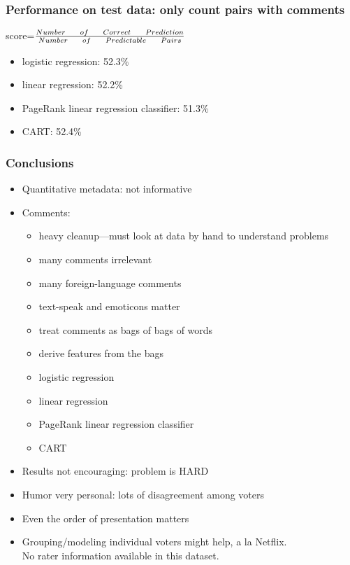 \documentclass[fleqn]{beamer}
\begin{document}
\begin{frame}
\frametitle{Performance on test data: only count pairs with comments}
\begin{beamerboxesrounded}{}
	\begin{center}
	 score=$\frac{Number \indent of \indent Correct \indent Prediction}{Number \indent of \indent Predictable \indent Pairs}$
         \end{center}
	\end{beamerboxesrounded}
      \begin{itemize}
        \item logistic regression: 52.3\%
        \item linear regression: 52.2\%
        \item PageRank linear regression classifier: 51.3\%
        \item CART: 52.4\% 
    \end{itemize}

\end{frame}

\begin{frame}
\frametitle{Conclusions}
    \begin{itemize}
        \item Quantitative metadata: not informative
        \item Comments: 
        	\begin{itemize}
	   \item heavy cleanup---must look at data by hand to understand problems
	   \item many comments irrelevant
	   \item many foreign-language comments
	   \item text-speak and emoticons matter
	   \item treat comments as bags of bags of words
	   \item derive features from the bags
	   \item logistic regression
	   \item linear regression
	   \item PageRank linear regression classifier
	   \item CART
	\end{itemize}
       \item Results not encouraging: problem is HARD
       \item Humor very personal: lots of disagreement among voters
       \item Even the order of presentation matters
       \item Grouping/modeling individual voters might help, a la Netflix. \\
                No rater information available in this dataset.
    \end{itemize}

\end{frame}
\end{document}

